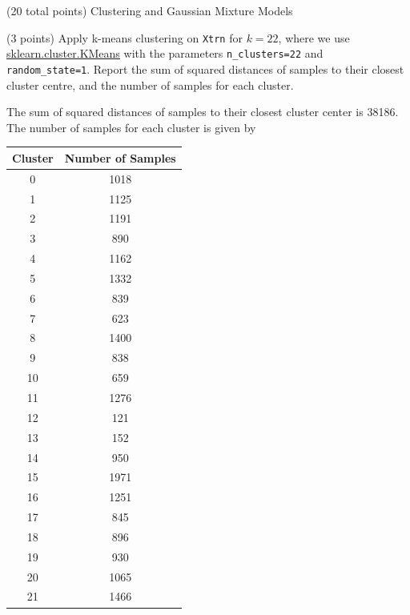 \documentclass[12pt]{article}
\begin{document}
\begin{question}{(20 total points) Clustering and Gaussian Mixture Models}  


  


  \medskip
   \begin{subquestion}{(3 points)
       Apply k-means clustering on {\tt Xtrn} for $k = 22$, where we use
       \href{https://scikit-learn.org/0.19/modules/generated/sklearn.cluster.KMeans.html}{sklearn.cluster.KMeans}
       with the parameters {\tt n\_clusters=22} and {\tt random\_state=1}.
       Report the sum of squared distances of samples to their closest
       cluster centre, and the number of samples for each cluster.
     } \label{Q3.1}
   

      \begin{answerbox}{35em}
         The sum of squared distances of samples to their closest cluster center is 38186.
			The number of samples for each cluster is given by
			\begin{center}
				\begin{tabular}{ | c | c |} \hline
					Cluster & Number of Samples \\ \hline
					0 & 1018\\ \hline
					1 & 1125\\ \hline
					2 & 1191\\ \hline
					3 & 890\\ \hline
					4 & 1162\\ \hline
					5 & 1332\\ \hline
					6 & 839\\ \hline
					7 & 623\\ \hline
					8 & 1400\\ \hline
					9 & 838\\ \hline
					10 & 659\\ \hline
					11 & 1276\\ \hline
					12 & 121\\ \hline
					13 & 152\\ \hline
					14 & 950\\ \hline
					15 & 1971\\ \hline
					16 & 1251\\ \hline
					17 & 845\\ \hline
					18 & 896\\ \hline
					19 & 930\\ \hline
					20 & 1065\\ \hline
					21 & 1466\\ \hline
				\end{tabular}
			\end{center}


\end{answerbox}
\end{subquestion}
\end{question}
\end{document}

